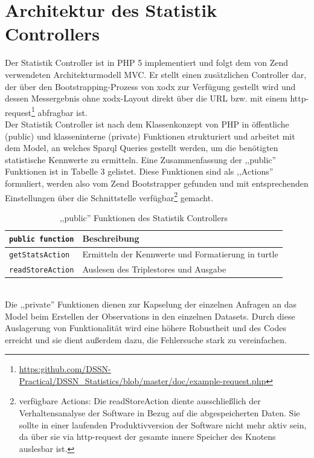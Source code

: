 \documentclass{article}
\begin{document}
\section{Architektur des Statistik Controllers}
Der Statistik Controller ist in PHP 5 implementiert und folgt dem von Zend verwendeten Architekturmodell MVC. Er stellt einen zusätzlichen Controller dar, der über den Bootstrapping-Prozess von xodx zur Verfügung gestellt wird und dessen Messergebnis ohne xodx-Layout direkt über die URL bzw. mit einem http-request\footnote{\url{https:github.com/DSSN-Practical/DSSN\_Statistics/blob/master/doc/example-request.php}} abfragbar ist.\\
Der Statistik Controller ist nach dem Klassenkonzept von PHP in öffentliche (public) und klasseninterne (private) Funktionen strukturiert und arbeitet mit dem Model, an welches Sparql Queries gestellt werden, um die benötigten statistische Kennwerte zu ermitteln. Eine Zusammenfassung der ,,public'' Funktionen ist in Tabelle 3 gelistet. \newpage
Diese Funktionen sind als ,,Actions'' formuliert, werden also vom Zend Bootstrapper gefunden und mit entsprechenden Einstellungen über die Schnittstelle verfügbar\footnote{verfügbare Actions: Die readStoreAction diente ausschließlich der Verhaltensanalyse der Software in Bezug auf die abgespeicherten Daten. Sie sollte in einer laufenden Produktivversion der Software nicht mehr aktiv sein, da über sie via http-request der gesamte innere Speicher des Knotens auslesbar ist.} gemacht.\\
\begin{table}[ht]
\centering
\label{table3}
\begin{tabular}{|l|l|}
\hline
\texttt{public function} & Beschreibung \\ \hline
\texttt{getStatsAction}       & Ermitteln der Kennwerte und Formatierung in turtle 	\\ \hline
\texttt{readStoreAction}      & Auslesen des Triplestores und Ausgabe	\\ \hline
\end{tabular}
\caption{,,public'' Funktionen des Statistik Controllers}
\end{table}\\
Die ,,private'' Funktionen dienen zur Kapselung der einzelnen Anfragen an das Model beim Erstellen der Observations in den einzelnen Datasets. Durch diese Auslagerung von Funktionalität wird eine höhere Robustheit und des Codes erreicht und sie dient außerdem dazu, die Fehlersuche stark zu vereinfachen.
\end{document}
